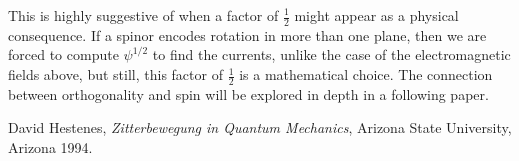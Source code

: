 \documentclass{birkjour}
\begin{document}
This is highly suggestive of when a factor of $\frac{1}{2}$ might appear as a physical consequence. If a spinor encodes rotation in more than one plane, then we are forced to compute $\psi^{1/2}$ to find the currents, unlike the case of the electromagnetic fields above, but still, this factor of $\frac{1}{2}$ is a mathematical choice. The connection between orthogonality and spin will be explored in depth in a following paper.

\begin{thebibliography}{9}

  David Hestenes,
  \emph{Zitterbewegung in Quantum Mechanics},
   Arizona State University, Arizona
  1994.

\end{thebibliography}
\end{document}
